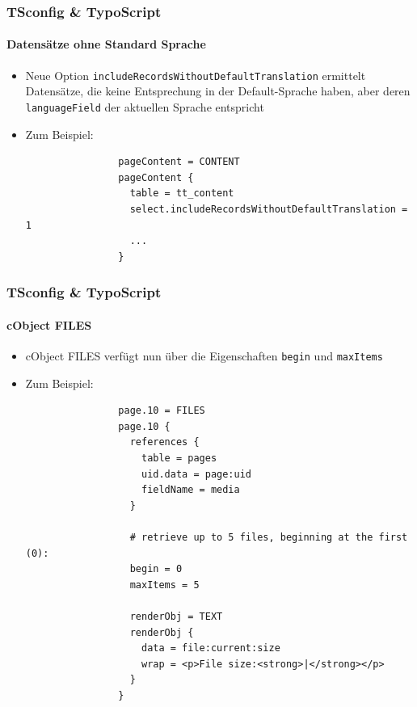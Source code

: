 
\begin{frame}[fragile]
	\frametitle{TSconfig \& TypoScript}
	\framesubtitle{Datensätze ohne Standard Sprache}

	\begin{itemize}

		\item Neue Option \texttt{includeRecordsWithoutDefaultTranslation}
			ermittelt Datensätze, die keine Entsprechung in der Default-Sprache haben,
			aber deren \texttt{languageField} der aktuellen Sprache entspricht

		\item Zum Beispiel:

			\begin{lstlisting}
				pageContent = CONTENT
				pageContent {
				  table = tt_content
				  select.includeRecordsWithoutDefaultTranslation = 1
				  ...
				}
			\end{lstlisting}

	\end{itemize}

\end{frame}


\begin{frame}[fragile]
	\frametitle{TSconfig \& TypoScript}
	\framesubtitle{cObject FILES}

	\begin{itemize}

		\item cObject FILES verfügt nun über die Eigenschaften \texttt{begin} und \texttt{maxItems}

		\item Zum Beispiel:

			\lstset{
				basicstyle=\tiny\ttfamily
			}

			\begin{lstlisting}
				page.10 = FILES
				page.10 {
				  references {
				    table = pages
				    uid.data = page:uid
				    fieldName = media
				  }

				  # retrieve up to 5 files, beginning at the first (0):
				  begin = 0
				  maxItems = 5

				  renderObj = TEXT
				  renderObj {
				    data = file:current:size
				    wrap = <p>File size:<strong>|</strong></p>
				  }
				}
			\end{lstlisting}

	\end{itemize}

\end{frame}

